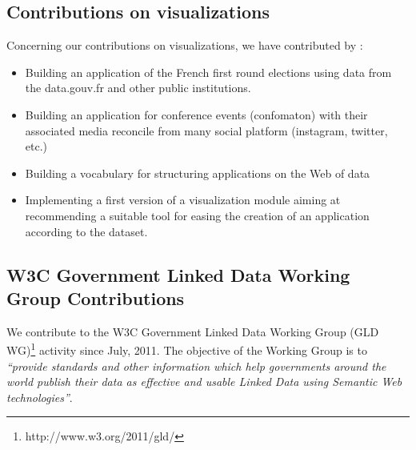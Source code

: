 \documentclass[a4paper,11pt]{report}
\begin{document}
\subsection{Contributions on visualizations}
Concerning our contributions on visualizations, we have contributed by :
\begin{itemize}
\item Building an application of the French first round elections using data from the data.gouv.fr and other public institutions.
\item Building an application for conference events (confomaton) with their associated media reconcile from many social platform (instagram, twitter, etc.)
\item Building a vocabulary for structuring applications on the Web of data
\item Implementing a first version of a visualization module aiming at recommending a suitable tool for easing the creation of an application according to the dataset.

\end{itemize}

\subsection{W3C Government Linked Data Working Group Contributions}
We contribute to the W3C Government Linked Data Working Group (GLD WG)\footnote{http://www.w3.org/2011/gld/} activity since July, 2011.  The objective of the Working Group is to \textit{``provide standards and other information which help governments around the world publish their data as effective and usable Linked Data using Semantic Web technologies''}. %
\end{document}
